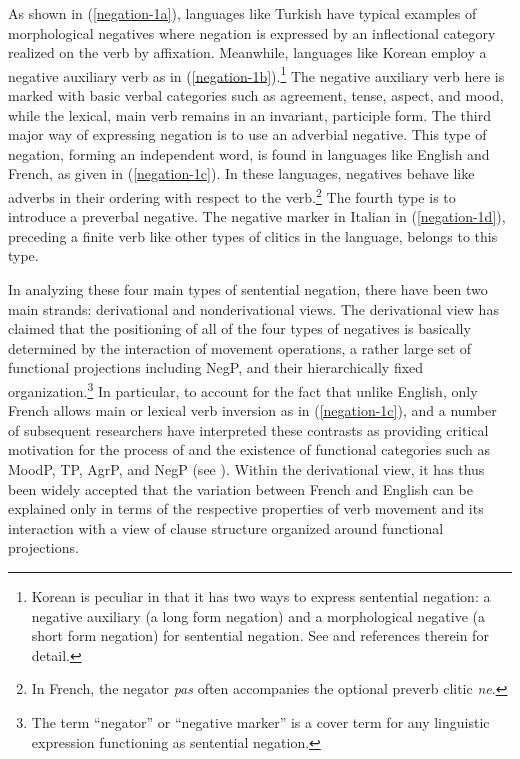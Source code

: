 \documentclass[output=paper
                ,modfonts
                ,nonflat
	        ,collection
	        ,collectionchapter
	        ,collectiontoclongg
 	        ,biblatex
                ,babelshorthands
                ,newtxmath
                ,draftmode
                ,colorlinks, citecolor=brown
]{./langsci/langscibook}
\begin{document}
{\noindent
As shown in (\ref{negation-1a}), languages like Turkish
have typical examples of morphological negatives where
negation is expressed by an inflectional category realized on the
verb by affixation. Meanwhile, languages like Korean
 employ a negative auxiliary verb as in (\ref{negation-1b}).\footnote{Korean
 is peculiar in that it has two ways to
 express sentential negation: a negative auxiliary (a long form
 negation)  and a morphological negative (a short form negation)
 for sentential negation. See \citet{Kim:00,Kim:16} and references therein for detail.}
  The negative auxiliary
 verb here is marked with basic verbal categories such as agreement, tense, aspect, and mood, while the lexical, main verb remains in an invariant, participle form. The third major way of expressing negation is to use an adverbial
negative. This type of negation, forming an independent word, is found in
languages like English and French, as given in (\ref{negation-1c}). In these languages, negatives behave like adverbs in their ordering with respect to the verb.\footnote{In French, the negator \emph{pas}
often accompanies the optional preverb clitic \emph{ne}.} The fourth
type is to introduce a preverbal negative. The negative marker in Italian in (\ref{negation-1d}), preceding a finite verb like other types of clitics in the language,
belongs to this type.


In analyzing these four main types of sentential negation, there have been two main strands: derivational and nonderivational views. The derivational view has claimed that the positioning of all of the
four types of negatives is basically determined by the interaction of movement
operations, a rather large set of functional projections including NegP,
and their hierarchically fixed organization.\footnote{The term ``negator'' or ``negative marker'' is a cover term for any linguistic expression functioning as sentential negation.}
In particular, to account for the
fact that unlike English, only French allows main or lexical verb inversion
as in (\ref{negation-1c}), \citet{Pollock:89,Pollock:94} and a number of subsequent researchers
have interpreted these contrasts as providing critical motivation for
the process of  and the existence of functional
categories such as MoodP, TP, AgrP, and NegP (see \citealt{Belletti:90, Zanuttini:97,Chomsky:91,Chomsky:93,Lasnik:95, Haegeman:95,Haegeman:97, Vikner97a-u, Zanuttini:2001, Zeijlstra:15}).
Within the derivational view, it has thus been widely
accepted that the variation between French and English can be explained only in terms of the respective properties of verb movement and its interaction with a view of clause
structure organized around functional projections.


}
\end{document}
